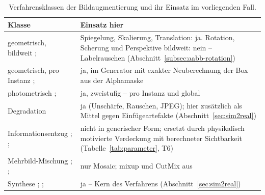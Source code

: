 \begin{table}[htbp]
\centering
\caption[Verfahrensklassen der Bildaugmentierung]{Verfahrensklassen der
Bildaugmentierung und ihr Einsatz im vorliegenden Fall.}
\label{tab:taxonomie}
\footnotesize
\begin{tabularx}{\textwidth}{@{}L{0.19\textwidth}X@{}}
\toprule
\textbf{Klasse} & \textbf{Einsatz hier} \\
\midrule
geometrisch, bildweit \newline
\scriptsize\cite{krizhevsky2012}; \cite{simard2003} &
Spiegelung, Skalierung, Translation: ja. Rotation, Scherung und Perspektive
bildweit: nein -- Labelrauschen (Abschnitt~\ref{subsec:aabb-rotation}) \\
\addlinespace
geometrisch, pro Instanz \newline
\scriptsize\cite{dwibedi2017}; \cite{ghiasi2021} &
ja, im Generator mit exakter Neuberechnung der Box aus der Alphamaske \\
\addlinespace
photometrisch \newline
\scriptsize\cite{krizhevsky2012}; \cite{grossberg2003} &
ja, zweistufig -- pro Instanz und global \\
\addlinespace
Degradation \newline
\scriptsize\cite{hendrycks2019} &
ja (Unschärfe, Rauschen, JPEG); hier zusätzlich als Mittel gegen
Einfügeartefakte (Abschnitt~\ref{sec:sim2real}) \\
\addlinespace
Informationsentzug \newline
\scriptsize\cite{devries2017cutout}; \cite{zhong2020erasing};
\cite{singh2017hideseek} &
nicht in generischer Form; ersetzt durch physikalisch motivierte Verdeckung mit
berechneter Sichtbarkeit (Tabelle~\ref{tab:parameter}, T6) \\
\addlinespace
Mehrbild-Mischung \newline
\scriptsize\cite{zhang2018mixup}; \cite{yun2019cutmix}; \cite{bochkovskiy2020} &
nur Mosaic; mixup und CutMix aus \\
\addlinespace
Synthese \newline
\scriptsize\cite{dvornik2018}; \cite{tobin2017}; \cite{tremblay2018} &
ja -- Kern des Verfahrens (Abschnitt~\ref{sec:sim2real}) \\
\bottomrule
\end{tabularx}
\end{table}

